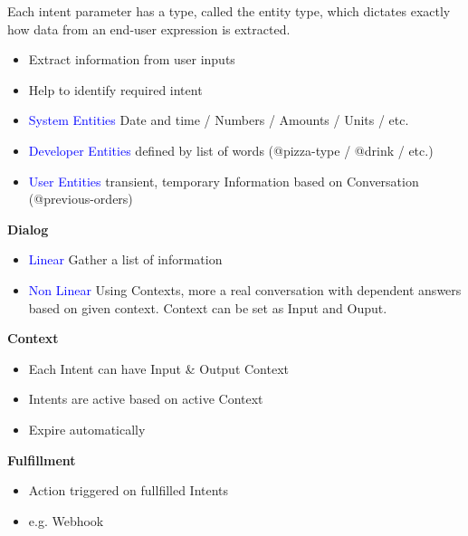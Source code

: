 Each intent parameter has a type, called the entity type, which dictates exactly how data from an end-user expression is extracted.
\begin{itemize}
    \item Extract information from user inputs
    \item Help to identify required intent
    \item \textcolor{blue}{System Entities} Date and time / Numbers / Amounts / Units / etc.
    \item \textcolor{blue}{Developer Entities} defined by list of words (@pizza-type / @drink / etc.)
    \item \textcolor{blue}{User Entities} transient, temporary Information based on Conversation (@previous-orders)
\end{itemize}
\vspace{10pt}
\textbf{Dialog}
\begin{itemize}
    \item \textcolor{blue}{Linear} Gather a list of information
    \item \textcolor{blue}{Non Linear} Using Contexts, more a real conversation with dependent answers based on given context. Context can be set as Input and Ouput.
\end{itemize}
\vspace{10pt}
\textbf{Context}
\begin{itemize}
    \item Each Intent can have Input \& Output Context
    \item Intents are active based on active Context
    \item Expire automatically
\end{itemize}
\vspace{10pt}
\textbf{Fulfillment}
\begin{itemize}
    \item Action triggered on fullfilled Intents
    \item e.g. Webhook
\end{itemize}

